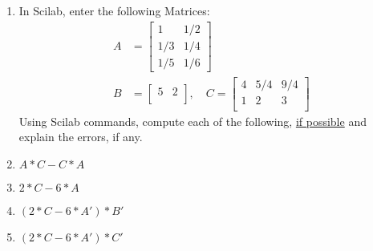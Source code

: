 \documentclass[12pt,a4paper]{article}
\newenvironment{enumcpt}{\begin{enumerate} \topsep -3mm \partopsep -3mm 
                        \parsep -3mm
                        \itemsep -0mm \leftmargin -1in \rightmargin -3mm
                        }{\end{enumerate}}
\begin{document}
\begin{multicols}{2}
\begin{enumcpt}
\begin{enumcpt}
\item In Scilab, enter the following Matrices: 
\begin{align*}
A&=\begin{bmatrix}
1 & 1/2\\
1/3 & 1/4\\
1/5 & 1/6
\end{bmatrix} \\
B& =\begin{bmatrix}
5 & 2\\
\end{bmatrix},
\quad
C=\begin{bmatrix}
4 & 5/4 & 9/4\\
1 & 2 & 3\\
\end{bmatrix}
\end{align*}
Using Scilab commands, compute each of the following, \underline{if possible} and explain the errors, if any.
\item $A*C −C*A$
\item $2*C-6*A$
\item $(2*C - 6*A')*B'$
\item $(2*C - 6*A')*C'$

\end{enumcpt} 


\end{enumcpt}
\end{multicols}
\end{document}
